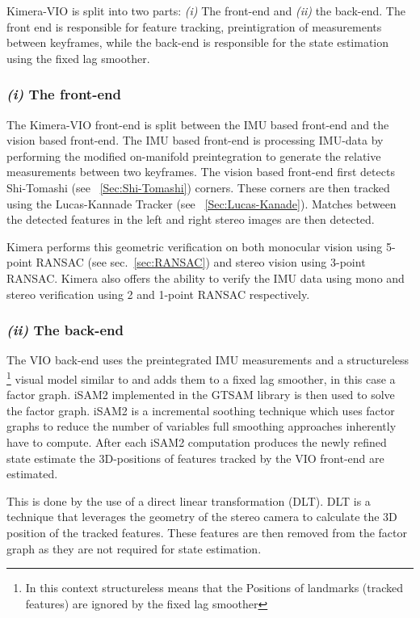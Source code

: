 \documentclass[11pt,a4paper]{article}
\begin{document}
Kimera-VIO is split into two parts: \textit{(i)} The front-end and \textit{(ii)} the back-end. 
The front end is responsible for feature tracking, preintigration of measurements between keyframes, while the back-end is responsible for the state estimation using the fixed lag smoother. 
\subsubsection*{\textit{(i)} The front-end}\label{para:geometric verification} 

The Kimera-VIO front-end is split between the IMU based front-end and the vision based front-end.
The IMU based front-end is processing IMU-data by performing the modified on-manifold preintegration to generate the relative measurements between two keyframes. 
The vision based front-end first detects Shi-Tomashi (see ~\ref{Sec:Shi-Tomashi}) corners. 
These corners are then tracked using the Lucas-Kannade Tracker \cite{lucas1981iterative} (see ~\ref{Sec:Lucas-Kanade}). 
Matches between the detected features in the left and right stereo images are then detected.  

Kimera performs this geometric verification on both monocular vision using 5-point RANSAC (see sec.~\ref{sec:RANSAC}) and stereo vision using 3-point RANSAC.
Kimera also offers the ability to verify the IMU data using mono and stereo verification using 2 and 1-point RANSAC respectively.

\subsubsection*{\textit{(ii)} The back-end}
The VIO back-end uses the preintegrated IMU measurements and a structureless \footnote{In this context structureless means that the Positions of landmarks (tracked features) are ignored by the fixed lag smoother} visual model similar to \cite{Forster_2017} and adds them to a fixed lag smoother, in this case a factor graph. 
iSAM2 implemented in the GTSAM library is then used to solve the factor graph. 
iSAM2 is a incremental soothing technique which uses factor graphs to reduce the number of variables full smoothing approaches inherently have to compute. 
After each iSAM2 computation produces the newly refined state estimate the 3D-positions of features tracked by the VIO front-end are estimated.

This is done by the use of a direct linear transformation (DLT). 
DLT is a technique that leverages the geometry of the stereo camera to calculate the 3D position of the tracked features.
These features are then removed from the factor graph as they are not required for state estimation.
\end{document}
